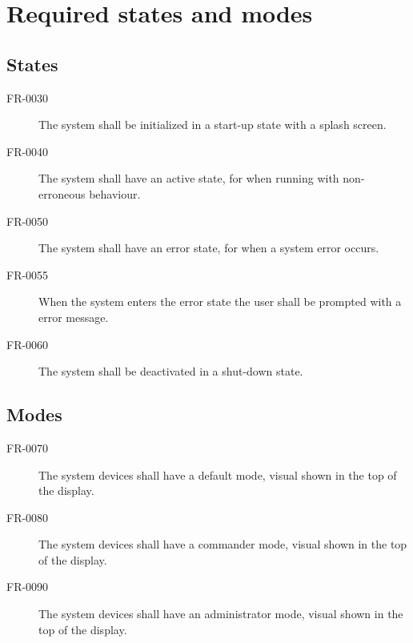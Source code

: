 \section{Required states and modes}

\subsection{States}
\begin{description}
  \item[FR-0030] The system shall be initialized in a start-up state with a splash screen.
  \item[FR-0040] The system shall have an active state, for when running with non-erroneous behaviour.
  \item[FR-0050] The system shall have an error state, for when a system error occurs.
  \item[FR-0055] When the system enters the error state the user shall be prompted with a error message. 
  \item[FR-0060] The system shall be deactivated in a shut-down state.
\end{description}

\subsection{Modes}
\begin{description}
  \item[FR-0070] The system devices shall have a default mode, visual shown in the top of the display. 
  \item[FR-0080] The system devices shall have a commander mode, visual shown in the top of the display. 
  \item[FR-0090] The system devices shall have an administrator mode, visual shown in the top of the display. 
\end{description}
